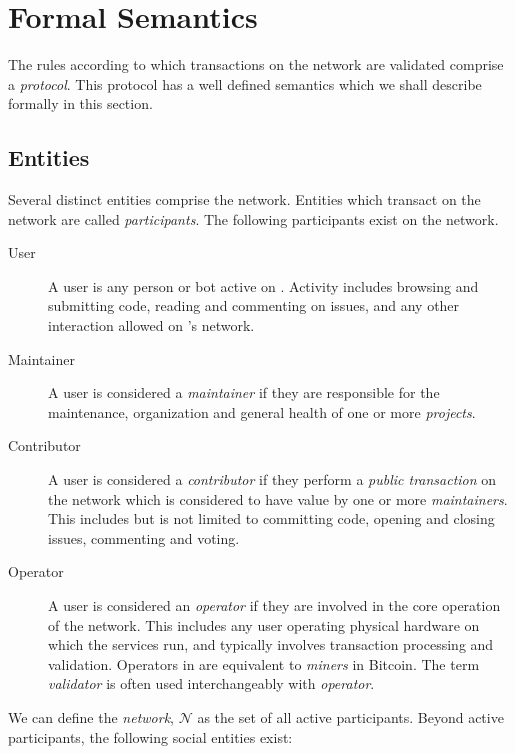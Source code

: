 \section{Formal Semantics}

The rules according to which transactions on the \oscoin{} network are
validated comprise a \emph{protocol}. This protocol has a well defined semantics
which we shall describe formally in this section.

\subsection{Entities}

\noindent Several distinct entities comprise the network.  Entities which
transact on the network are called \emph{participants}. The following
participants exist on the \oscoin{} network.

\addvspace{1em}

\begin{description}
    \item[User] A user is any person or bot active on \oscoin{}.  Activity
        includes browsing and submitting code, reading and commenting on
        issues, and any other interaction allowed on \oscoin{}'s network.
    \item[Maintainer] A user is considered a \emph{maintainer} if they
        are responsible for the maintenance, organization and general health of
        one or more \emph{projects}.
    \item[Contributor] A user is considered a \emph{contributor} if they
        perform a \emph{public transaction} on the network which is considered
        to have value by one or more \emph{maintainers}. This includes but is
        not limited to committing code, opening and closing issues, commenting
        and voting.
    \item[Operator] A user is considered an \emph{operator} if they are involved
        in the core operation of the network. This includes any user operating
        physical hardware on which the \oscoin{} services run, and typically
        involves transaction processing and validation. Operators in \oscoin{}
        are equivalent to \emph{miners} in Bitcoin. The term \emph{validator}
        is often used interchangeably with \emph{operator}.
\end{description}
\addvspace{1em}

We can define the \emph{network}, $\mathcal{N}$ as the set of all active
participants. Beyond active participants, the following social entities
exist:

